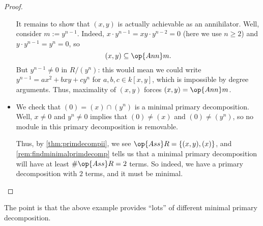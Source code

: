 \documentclass[../notes.tex]{subfiles}
\begin{document}
\begin{proof}
\begin{itemize}
		It remains to show that $(x,y)$ is actually achievable as an annihilator. Well, consider $m:=y^{n-1}$. Indeed, $x\cdot y^{n-1}=xy\cdot y^{n-2}=0$ (here we use $n\ge2$) and $y\cdot y^{n-1}= y^n=0$, so
		\[(x,y)\subseteq\op{Ann}m.\]
		But $y^{n-1}\ne0$ in $R/\left(y^n\right)$: this would mean we could write $y^{n-1}=ax^2+bxy+cy^n$ for $a,b,c\in k[x,y]$, which is impossible by degree arguments. Thus, maximality of $(x,y)$ forces $(x,y)=\op{Ann}m$.

		\item We check that $(0)=(x)\cap\left(y^n\right)$ is a minimal primary decomposition. Well, $x\ne0$ and $y^n\ne0$ implies that $(0)\ne(x)$ and $(0)\ne\left(y^n\right)$, so no module in this primary decomposition is removable.
		
		Thus, by \autoref{thm:primdecompii}, we see $\op{Ass}R=\{(x,y),(x)\}$, and \autoref{rem:findminimalprimdecomp} tells us that a minimal primary decomposition will have at least $\#\op{Ass}R=2$ terms. So indeed, we have a primary decomposition with $2$ terms, and it must be minimal.
		\qedhere
	\end{itemize}
\end{proof}
The point is that the above example provides ``lots'' of different minimal primary decomposition.
\end{document}
